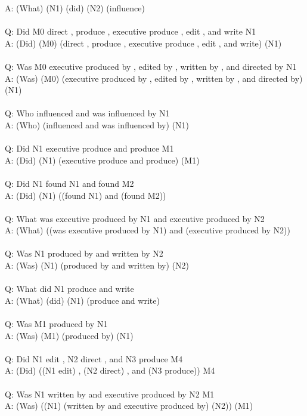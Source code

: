 \documentclass{article} \usepackage{iclr2022_conference,times}
\begin{document}
{A: (What) (N1) (did) (N2) (influence) \\
 \\
Q: Did M0 direct , produce , executive produce , edit , and write N1 \\
A: (Did) (M0) (direct , produce , executive produce , edit , and write) (N1) \\
 \\
Q: Was M0 executive produced by , edited by , written by , and directed by N1 \\
A: (Was) (M0) (executive produced by , edited by , written by , and directed by) (N1) \\
 \\
Q: Who influenced and was influenced by N1 \\
A: (Who) (influenced and was influenced by) (N1) \\
 \\
Q: Did N1 executive produce and produce M1 \\
A: (Did) (N1) (executive produce and produce) (M1) \\
 \\
Q: Did N1 found N1 and found M2 \\
A: (Did) (N1) ((found N1) and (found M2)) \\
 \\
Q: What was executive produced by N1 and executive produced by N2 \\
A: (What) ((was executive produced by N1) and (executive produced by N2)) \\
 \\
Q: Was N1 produced by and written by N2 \\
A: (Was) (N1) (produced by and written by) (N2) \\
 \\
Q: What did N1 produce and write \\
A: (What) (did) (N1) (produce and write) \\
 \\
Q: Was M1 produced by N1 \\
A: (Was) (M1) (produced by) (N1) \\
 \\
Q: Did N1 edit , N2 direct , and N3 produce M4 \\
A: (Did) ((N1 edit) , (N2 direct) , and (N3 produce)) M4 \\
 \\
Q: Was N1 written by and executive produced by N2 M1 \\
A: (Was) ((N1) (written by and executive produced by) (N2)) (M1) \\
}
\end{document}
